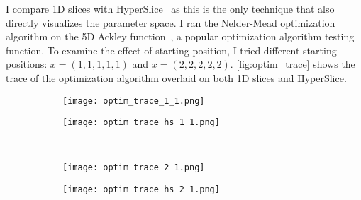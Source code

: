 I compare 1D slices with HyperSlice~\cite{Wijk:1993} as this is the only
technique that also directly visualizes the parameter space.  I ran the
Nelder-Mead optimization algorithm on the 5D Ackley
function~\cite{Ackley:1987}, a popular optimization algorithm testing function.
To examine the effect of starting position, I tried different starting
positions: \(x=(1,1,1,1,1)\) and \(x=(2,2,2,2,2)\).  \autoref{fig:optim_trace}
shows the trace of the optimization algorithm overlaid on both 1D slices and
HyperSlice.

\begin{figure}
  \centering
  \begin{subfigure}[b]{0.35\linewidth}
    \texttt{[image: optim\_trace\_1\_1.png]}
    \subcaption{ 
      \label{fig:optim_1:sp}
    }
  \end{subfigure}
  \qquad\qquad
  \begin{subfigure}[b]{0.35\linewidth}
    \texttt{[image: optim\_trace\_hs\_1\_1.png]}
    \subcaption{
      \label{fig:optim_1:hs}
    }
  \end{subfigure}
  \\
  \begin{subfigure}[b]{0.35\linewidth}
    \texttt{[image: optim\_trace\_2\_1.png]}
    \subcaption{
      \label{fig:optim_2:sp}
    }
  \end{subfigure}
  \qquad\qquad
  \begin{subfigure}[b]{0.35\linewidth}
    \texttt{[image: optim\_trace\_hs\_2\_1.png]}

\end{subfigure}
\end{figure}
